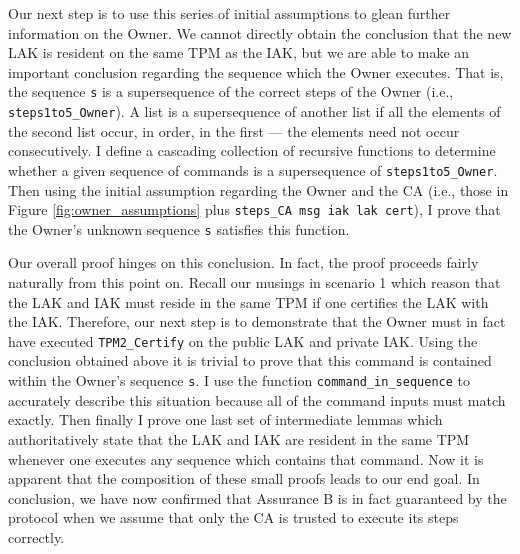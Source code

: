 Our next step is to use this series of initial assumptions to glean further information on the Owner. We cannot directly obtain the conclusion that the new LAK is resident on the same TPM as the IAK, but we are able to make an important conclusion regarding the sequence which the Owner executes. That is, the sequence \verb|s| is a supersequence of the correct steps of the Owner (i.e., \verb|steps1to5_Owner|). A list is a supersequence of another list if all the elements of the second list occur, in order, in the first --- the elements need not occur consecutively. I define a cascading collection of recursive functions to determine whether a given sequence of commands is a supersequence of \verb|steps1to5_Owner|. 
Then using the initial assumption regarding the Owner and the CA (i.e., those in Figure \ref{fig:owner_assumptions} plus \verb|steps_CA msg iak lak cert|), I prove that the Owner's unknown sequence \verb|s| satisfies this function.


Our overall proof hinges on this conclusion. In fact, the proof proceeds fairly naturally from this point on. Recall our musings in scenario 1 which reason that the LAK and IAK must reside in the same TPM if one certifies the LAK with the IAK. Therefore, our next step is to demonstrate that the Owner must in fact have executed \verb|TPM2_Certify| on the public LAK and private IAK. 
Using the conclusion obtained above it is trivial to prove that this command is contained within the Owner's sequence \verb|s|.
I use the function \verb|command_in_sequence| to accurately describe this situation because all of the command inputs must match exactly. 
Then finally I prove one last set of intermediate lemmas which authoritatively state that the LAK and IAK are resident in the same TPM whenever one executes any sequence which contains that command.
Now it is apparent that the composition of these small proofs leads to our end goal.
In conclusion, we have now confirmed that Assurance B is in fact guaranteed by the protocol when we assume that only the CA is trusted to execute its steps correctly. 



\newpage
